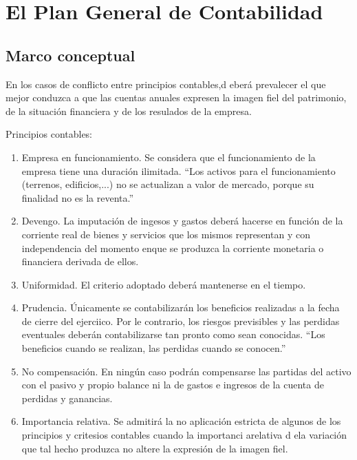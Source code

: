 \section{El Plan General de Contabilidad}
\subsection{Marco conceptual}
En los casos de conflicto entre principios contables,d eberá prevalecer el que mejor conduzca a que las cuentas anuales expresen la imagen fiel del patrimonio, de la situación financiera y de los resulados de la empresa.

Principios contables:
\begin{enumerate}
    \item Empresa en funcionamiento. Se considera que el funcionamiento de la empresa tiene una duración ilimitada. ``Los activos para el funcionamiento (terrenos, edificios,...) no se actualizan a valor de mercado, porque su finalidad no es la reventa.''
    \item Devengo. La imputación de ingesos y gastos deberá hacerse en función de la corriente real de bienes y servicios que los mismos representan y con independencia del momento enque se produzca la corriente monetaria o financiera derivada de ellos.
    \item Uniformidad. El criterio adoptado deberá mantenerse en el tiempo.
    \item Prudencia. Únicamente se contabilizarán los beneficios realizadas a la fecha de cierre del ejerciico. Por le contrario, los riesgos previsibles y las perdidas eventuales deberán contabilizarse tan pronto como sean conocidas. ``Los beneficios cuando se realizan, las perdidas cuando se conocen.''
    \item No compensación. En ningún caso podrán compensarse las partidas del activo con el pasivo y propio balance ni la de gastos e ingresos de la cuenta de perdidas y ganancias.
    \item Importancia relativa. Se admitirá la no aplicación estricta de algunos de los principios y critesios contables cuando la importanci arelativa d ela variación que tal hecho produzca no altere la expresión de la imagen fiel.
\end{enumerate}

